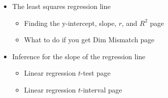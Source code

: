 \begin{itemize}
\item[] The least squares regression line
\begin{itemize}\vspace{-1mm}
\setlength{\itemsep}{0mm}
\item[] Finding the y-intercept, slope, $r$, and $R^2$ \hfill page~\pageref{calclinreg}
\item[] What to do if you get Dim Mismatch \hfill page~\pageref{dimmismatch}
\end{itemize}


\item[] Inference for the slope of the regression line
\begin{itemize}\vspace{-1mm}
\setlength{\itemsep}{0mm}
\item[] Linear regression $t$-test  \hfill page~\pageref{LinRegtest}
\item[] Linear regression $t$-interval \hfill page~\pageref{LinRegint}
\end{itemize}



\end{itemize}

